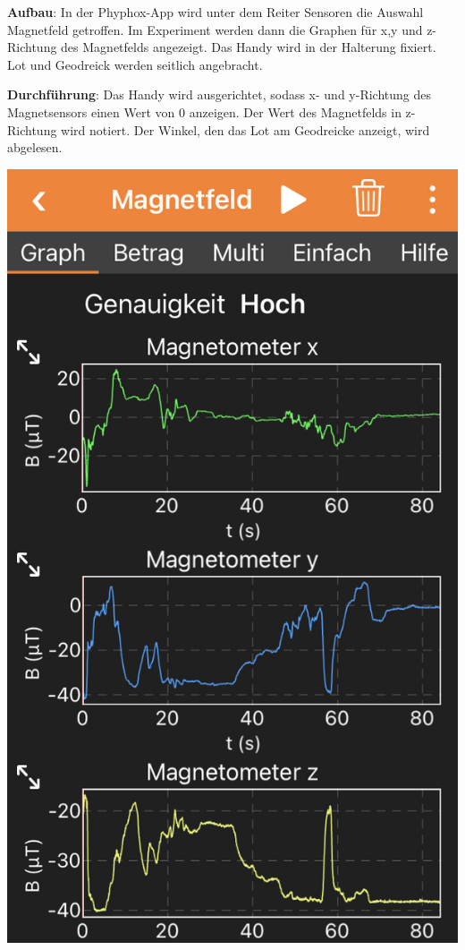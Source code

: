 \documentclass[../main.tex]{subfiles}
\begin{document}
\begin{tcolorbox}
    \vspace{0.2cm}
    \begin{minipage}[]{0.75\textwidth}
        \textbf{Aufbau}: In der Phyphox-App wird unter dem Reiter \glqq Sensoren\grqq{} die Auswahl \glqq Magnetfeld\grqq{} getroffen. Im Experiment werden dann die Graphen für x,y und z-Richtung des Magnetfelds angezeigt. Das Handy wird in der Halterung fixiert. Lot und Geodreick werden seitlich angebracht.  

        \vspace{0.5cm}
        \textbf{Durchführung}: Das Handy wird ausgerichtet, sodass x- und y-Richtung des Magnetsensors einen Wert von $0$ anzeigen. Der Wert des Magnetfelds in z-Richtung wird notiert. Der Winkel, den das Lot am Geodreicke anzeigt, wird abgelesen.  
    \end{minipage}
    \hspace{0.3cm}
    \begin{minipage}[]{0.2\textwidth}
        \includegraphics[width=\textwidth]{img/app}
    \end{minipage}


\end{tcolorbox}
\end{document}
